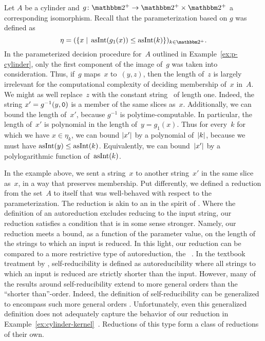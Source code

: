 \begin{example}
\label{ex:cylinder-kernel}%
  Let $A$ be a \pdash{}cylinder and $g\colon \binary^+ \to \binary^+ \times \binary^+$ a corresponding isomorphism.
  Recall that the parameterization based on $g$ was defined as
  \begin{equation*}
    \eta \deq (\{x \st \asNat(g_1(x)) \le \asNat(k)\})_{k \in \binary^+}.
  \end{equation*}
  In the parameterized decision procedure for~$A$ outlined in Example~\ref{ex:p-cylinder}, only the first component of the image of~$g$ was taken into consideration.
  Thus, if~$g$ maps~$x$ to~$(y, z)$, then the length of~$z$ is largely irrelevant for the computational complexity of deciding membership of~$x$ in~$A$.
  We might as well replace~$z$ with the constant string~ of length one.
  Indeed, the string $x' = g^{-1}(y, \textnormal{\texttt{0}})$ is a member of the same slices as~$x$.
  Additionally, we can bound the length of~$x'$, because $g^{-1}$ is polytime-computable.
  In particular, the length of~$x'$ is polynomial in the length of~$y = g_1(x)$.
  Thus for every~$k$ for which we have $x \in \eta_k$, we can bound ${\lvert x'\rvert}$ by a polynomial of~${\lvert k\rvert}$, because we must have $\operatorname{asInt}(y) \le \operatorname{asInt}(k)$.
  Equivalently, we can bound~${\lvert x'\rvert}$ by a polylogarithmic function of~$\operatorname{asInt}(k)$.
\end{example}

In the example above, we sent a string~$x$ to another string~$x'$ in the same slice as~$x$, in a way that preserves membership.
Put differently, we defined a reduction from the set~$A$ to itself that was well-behaved with respect to the parameterization.
The reduction is akin to an  in the spirit of \textcite{trakhtenbrot1970autoreducibility}.
Where the definition of an autoreduction excludes reducing to the input string, our reduction satisfies a condition that is in some sense stronger.
Namely, our reduction meets a bound, as a function of the parameter value, on the length of the strings to which an input is reduced.
In this light, our reduction can be compared to a more restrictive type of autoreduction, the ~\parencite{meyer1979with}.
In the textbook treatment by \textcite[Section~4.5]{balcazar1995structural}, self-reducibility is defined as autoreducibility where all strings to which an input is reduced are strictly shorter than the input.
However, many of the results around self-reducibility extend to more general orders than the \enquote{shorter than}-order.
Indeed, the definition of self-reducibility can be generalized to encompass such more general orders \parencite{ko1983self,orponen1986optimal,buhrman1996p-selective}.
Unfortunately, even this generalized definition does not adequately capture the behavior of our reduction in Example~\ref{ex:cylinder-kernel}~\parencite{chen2011lower}.
Reductions of this type form a class of reductions of their own.

